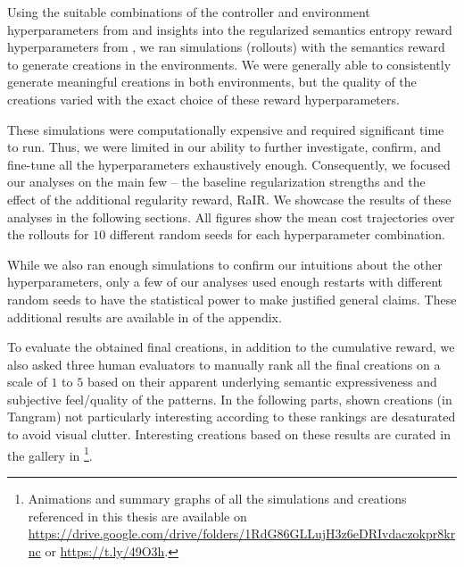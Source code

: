 Using the suitable combinations of the controller and environment hyperparameters from  and insights into the regularized semantics entropy reward hyperparameters from , we ran simulations (rollouts) with the semantics reward to generate creations in the environments.
We were generally able to consistently generate meaningful creations in both environments, but the quality of the creations varied with the exact choice of these reward hyperparameters.

These simulations were computationally expensive and required significant time to run.
Thus, we were limited in our ability to further investigate, confirm, and fine-tune all the hyperparameters exhaustively enough. 
Consequently, we focused our analyses on the main few -- the baseline regularization strengths and the effect of the additional regularity reward, RaIR.
We showcase the results of these analyses in the following sections.
All figures show the mean cost trajectories over the rollouts for \(10\) different random seeds for each hyperparameter combination.

While we also ran enough simulations to confirm our intuitions about the other hyperparameters, only a few of our analyses used enough restarts with different random seeds to have the statistical power to make justified general claims.
These additional results are available in  of the appendix.

To evaluate the obtained final creations, in addition to the cumulative reward, we also asked three human evaluators to manually rank all the final creations on a scale of \(1\) to \(5\) based on their apparent underlying semantic expressiveness and subjective feel/quality of the patterns.
In the following parts, shown creations (in Tangram) not particularly interesting according to these rankings are desaturated to avoid visual clutter.
Interesting creations based on these results are curated in the gallery in \footnote[1]{Animations and summary graphs of all the simulations and creations referenced in this thesis are available on \url{https://drive.google.com/drive/folders/1RdG86GLLujH3z6eDRIvdaczokpr8krnc} or \url{https://t.ly/49O3h}.}.



